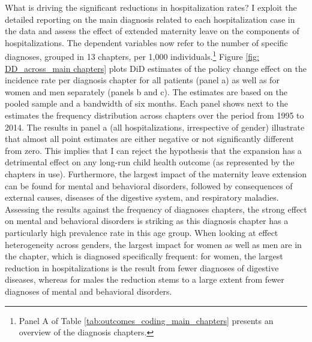 \documentclass[11pt, a4paper,draft]{article} %
\begin{document}
What is driving the significant reductions in hospitalization rates? I exploit the detailed reporting on the main diagnosis related to each hospitalization case in the data and assess the effect of extended maternity leave on the components of hospitalizations. The dependent variables now refer to the number of specific diagnoses, grouped in 13 chapters, per 1,000 individuals.\footnote{Panel A of Table \ref{tab:outcomes_coding_main_chapters} presents an overview of the diagnosis chapters.} 
Figure \ref{fig: DD_across_main chapters} plots DiD estimates of the policy change effect on the incidence rate per diagnosis chapter for all patients (panel a) as well as for women and men separately (panels b and c). The estimates are based on the pooled sample and a bandwidth of six months. Each panel shows next to the estimates the frequency distribution across chapters over the period from 1995 to 2014. The results in panel a (all hospitalizations, irrespective of gender) illustrate that almost all point estimates are either negative or not significantly different from zero. This implies that I can reject the hypothesis that the expansion has a detrimental effect on any long-run child health outcome (as represented by the chapters in use). Furthermore, the largest impact of the maternity leave extension can be found for mental and behavioral disorders, followed by consequences of external causes, diseases of the digestive system, and respiratory maladies. Assessing the results against the frequency of diagnoses chapters, the strong effect on mental and behavioral disorders is striking as this diagnosis chapter has a particularly high prevalence rate in this age group. When looking at effect heterogeneity across genders, the largest impact for women as well as men are in the chapter, which is diagnosed specifically frequent: for women, the largest reduction in hospitalizations is the result from fewer diagnoses of digestive diseases, whereas for males the reduction stems to a large extent from fewer diagnoses of mental and behavioral disorders. \newline
\end{document}
